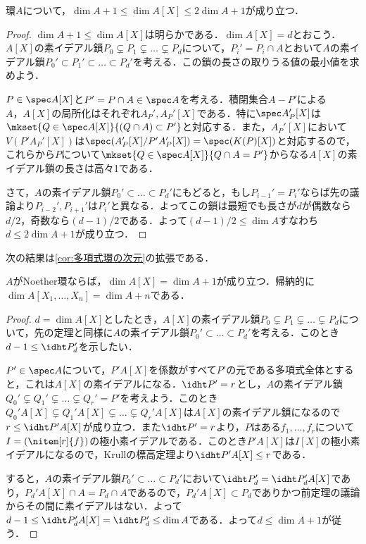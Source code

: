 \begin{thm}
	環$A$について，$\dim A+1\leq\dim A[X]\leq 2\dim A+1$が成り立つ．
\end{thm}

\begin{proof}
	$\dim A+1\leq\dim A[X]$は明らかである．$\dim A[X]=d$とおこう．$A[X]$の素イデアル鎖$P_0\subsetneq P_1\subsetneq\dots\subsetneq P_d$について，$P_i'=P_i\cap A$とおいて$A$の素イデアル鎖$P_0'\subset P_1'\subset\dots\subset P_d'$を考える．この鎖の長さの取りうる値の最小値を求めよう．
	
	$P\in\spec A[X]$と$P'=P\cap A\in\spec A$を考える．積閉集合$A-P'$による$A，A[X]$の局所化はそれぞれ$A_P',A_P'[X]$である．特に$\spec A_P'[X]$は$\mkset{Q\in\spec A[X]}{(Q\cap A)\subset P'}$と対応する．また，$A_P'[X]$において$V(P'A_P'[X])$は$\spec (A_P'[X]/P'A_P'[X])=\spec (K(P)[X])$と対応するので，これらから$P$について$\mkset{Q\in\spec A[X]}{Q\cap A=P'}$からなる$A[X]$の素イデアル鎖の長さは高々1である．
	
	さて，$A$の素イデアル鎖$P_0'\subset\dots\subset P_d'$にもどると，もし$P_{i-1}'=P_i'$ならば先の議論より$P_{i-2}',P_{i+1}'$は$P_i'$と異なる．よってこの鎖は最短でも長さが$d$が偶数なら$d/2$，奇数なら$(d-1)/2$である．よって$(d-1)/2\leq \dim A$すなわち$d\leq 2\dim A+1$が成り立つ．
\end{proof}

次の結果は\ref{cor:多項式環の次元}の拡張である．

\begin{cor}\label{cor:Noether多項式の次元}
	$A$がNoether環ならば，$\dim A[X]=\dim A+1$が成り立つ．帰納的に$\dim A[X_1,\dots,X_n]=\dim A+n$である．
\end{cor}

\begin{proof}
	$d=\dim A[X]$としたとき，$A[X]$の素イデアル鎖$P_0\subsetneq P_1\subsetneq\dots\subsetneq P_d$について，先の定理と同様に$A$の素イデアル鎖$P_0'\subset\dots\subset P_d'$を考える．このとき$d-1\leq\idht P_d'$を示したい．
	
	$P'\in\spec A$について，$P'A[X]$を係数がすべて$P'$の元である多項式全体とすると，これは$A[X]$の素イデアルになる．$\idht P'=r$とし，$A$の素イデアル鎖$Q_0'\subsetneq Q_1'\subsetneq\dots\subsetneq Q_r'=P'$を考えよう．このとき$Q_0'A[X]\subsetneq Q_1'A[X]\subsetneq\dots\subsetneq Q_r'A[X]$は$A[X]$の素イデアル鎖になるので$r\leq\idht P'A[X]$が成り立つ．また$\idht P'=r$より，$P$はある$f_1,\dots,f_r$について$I=(\nitem[r]{f})$の極小素イデアルである．このとき$P'A[X]$は$I[X]$の極小素イデアルになるので，Krullの標高定理より$\idht P'A[X]\leq r$である．
	
	すると，$A$の素イデアル鎖$P_0'\subset\dots\subset P_d'$において$\idht P_d'=\idht P_d'A[X]$であり，$P_d'A[X]\cap A=P_d\cap A$であるので，$P_d'A[X]\subset P_d$でありかつ前定理の議論からその間に素イデアルはない．よって$d-1\leq\idht P_d'A[X]=\idht P_d'\leq\dim A$である．よって$d\leq\dim A+1$が従う．
\end{proof}


